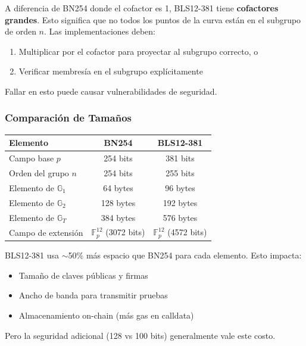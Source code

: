 \documentclass[11pt,a4paper,twoside,openright]{book}
\theoremstyle{definition}
\theoremstyle{plain}
\theoremstyle{remark}
\newcommand{\Fp}{\mathbb{F}_p}
\newcommand{\G}{\mathbb{G}}
\begin{document}
\begin{advertencia}
A diferencia de BN254 donde el cofactor es 1, BLS12-381 tiene \textbf{cofactores grandes}. Esto significa que no todos los puntos de la curva están en el subgrupo de orden $n$. Las implementaciones deben:
\begin{enumerate}
    \item Multiplicar por el cofactor para proyectar al subgrupo correcto, o
    \item Verificar membresía en el subgrupo explícitamente
\end{enumerate}

Fallar en esto puede causar vulnerabilidades de seguridad.
\end{advertencia}

\subsubsection{Comparación de Tamaños}

\begin{center}
\begin{tabular}{lcc}
\toprule
\textbf{Elemento} & \textbf{BN254} & \textbf{BLS12-381} \\
\midrule
Campo base $p$ & 254 bits & 381 bits \\
Orden del grupo $n$ & 254 bits & 255 bits \\
Elemento de $\G_1$ & 64 bytes & 96 bytes \\
Elemento de $\G_2$ & 128 bytes & 192 bytes \\
Elemento de $\G_T$ & 384 bytes & 576 bytes \\
Campo de extensión & $\Fp^{12}$ (3072 bits) & $\Fp^{12}$ (4572 bits) \\
\bottomrule
\end{tabular}
\end{center}

\begin{intuicion}
BLS12-381 usa $\sim$50\% más espacio que BN254 para cada elemento. Esto impacta:
\begin{itemize}
    \item Tamaño de claves públicas y firmas
    \item Ancho de banda para transmitir pruebas
    \item Almacenamiento on-chain (más gas en calldata)
\end{itemize}

Pero la seguridad adicional (128 vs 100 bits) generalmente vale este costo.
\end{intuicion}
\end{document}
